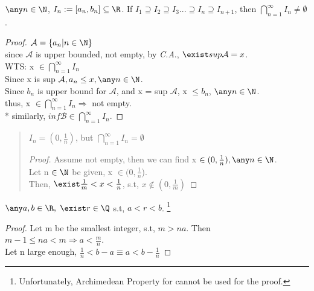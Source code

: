 \begin{theorem}
\label{Nested Interval Theorem}
$\any n \in \N$, $I_n := [a_n, b_n] \subseteq \R$. If $I_1 \supseteq I_2 \supseteq I_3 ... \supseteq I_n \supseteq I_{n+1}$, then $\bigcap\limits_{n=1}^{\infty} I_n \neq \emptyset$.
\end{theorem}

\begin{proof}
    $\mathcal{A} = \{a_n | n \in \N\}$\\
    since $\mathcal{A}$ is upper bounded, not empty, by \textit{C.A}., $\exist sup \mathcal{A} = x$.\\
    WTS: x $\in \bigcap\limits_{n=1}^{\infty} I_n$ \\
    Since x is sup $\mathcal{A}, a_n \leq x, \any n \in \N$.\\
    Since $b_n$ is upper bound for $\mathcal{A}$, and x = sup $\mathcal{A}$, x $\leq b_n$, $\any n \in \N$. \\
    thus, x $\in \bigcap\limits_{n=1}^{\infty} I_n \Rightarrow $ not  empty. \\
    * similarly, $inf \mathcal{B} \in \bigcap\limits_{n=1}^{\infty} I_n$.
\end{proof}

\begin{quote}
\begin{example}
$I_n = (0, \frac{1}{n})$, but $\bigcap\limits_{n=1}^{\infty} I_n = \emptyset$\\
\begin{proof}
    Assume not empty, then we can find x $\in (0, \frac{1}{n}), \any n \in \N$. \\
    Let n $\in \N$ be given, x $\in (0, \frac{1}{n}$).\\
    Then, $\exist \frac{1}{m} < x < \frac{1}{n}$, s.t, $x \notin (0, \frac{1}{m})$
\end{proof}
\end{example}
\end{quote}

\begin{theorem}
\label{Density of Q in R}
$\any a, b \in \R,$ $\exist r \in \Q $ s.t, $a < r < b$. 
\footnote{Unfortunately, Archimedean Property for \N cannot be used for the proof.}
\end{theorem}

\begin{proof}
    Let m be the smallest integer, s.t, $m>na$. Then $m-1 \leq na<m \Rightarrow a < \frac{m}{n}$.\\
    Let n large enough, $\frac{1}{n} < b-a \equiv a < b- \frac{1}{n}$ 
\end{proof}

